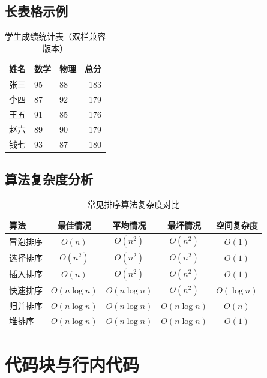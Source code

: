 \documentclass[../main]{subfiles}
\begin{document}
\subsection{长表格示例}

\begin{table}[H]
    \centering
    \caption{学生成绩统计表（双栏兼容版本）}
    \label{tab:grades-twocolumn}
    \begin{tabularx}{\linewidth}{|l|X|X|r|}
        \hline
        \textbf{姓名} & \textbf{数学} & \textbf{物理} & \textbf{总分} \\
        \hline
        张三 & 95 & 88 & 183 \\
        李四 & 87 & 92 & 179 \\
        王五 & 91 & 85 & 176 \\
        赵六 & 89 & 90 & 179 \\
        钱七 & 93 & 87 & 180 \\
        \hline
    \end{tabularx}
\end{table}

\subsection{算法复杂度分析}

\begin{table}[H]
\centering
\caption{常见排序算法复杂度对比}
\label{tab:algorithm-complexity}
\begin{tabular}{@{}lcccc@{}}
\toprule
\textbf{算法} & \textbf{最佳情况} & \textbf{平均情况} & \textbf{最坏情况} & \textbf{空间复杂度} \\
\midrule
冒泡排序 & $O(n)$ & $O(n^2)$ & $O(n^2)$ & $O(1)$ \\
选择排序 & $O(n^2)$ & $O(n^2)$ & $O(n^2)$ & $O(1)$ \\
插入排序 & $O(n)$ & $O(n^2)$ & $O(n^2)$ & $O(1)$ \\
快速排序 & $O(n\log n)$ & $O(n\log n)$ & $O(n^2)$ & $O(\log n)$ \\
归并排序 & $O(n\log n)$ & $O(n\log n)$ & $O(n\log n)$ & $O(n)$ \\
堆排序 & $O(n\log n)$ & $O(n\log n)$ & $O(n\log n)$ & $O(1)$ \\
\bottomrule
\end{tabular}
\end{table}

\section{代码块与行内代码}
\end{document}
